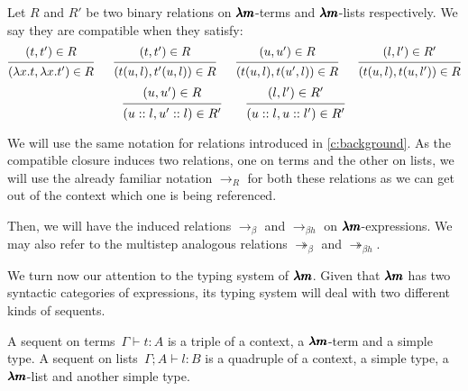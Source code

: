 \begin{definition}
  \label{compatible_relation}
  Let $R$ and $R'$ be two binary relations on $\pmb{\lambda m}$-terms and $\pmb{\lambda m}$-lists respectively.
  We say they are compatible when they satisfy:
  \[
    \begin{prooftree}
      \hypo{ (t, t') \in R }
      \infer1{ (\lambda x . t, \lambda x . t') \in R } 
    \end{prooftree}
    \quad \ \
    \begin{prooftree}
      \hypo{ (t, t') \in R }
      \infer1{ (t(u, l), t'(u, l)) \in R } 
    \end{prooftree}
    \quad \ \
    \begin{prooftree}
      \hypo{ (u, u') \in R }
      \infer1{ (t(u, l), t(u', l)) \in R } 
    \end{prooftree}
    \quad \ \
    \begin{prooftree}
      \hypo{ (l, l') \in R' }
      \infer1{ (t(u, l), t(u, l')) \in R } 
    \end{prooftree}
  \]
  \[
    \begin{prooftree}
      \hypo{ (u, u') \in R }
      \infer1{ (u::l, u'::l) \in R' } 
    \end{prooftree}
    \qquad
    \begin{prooftree}
      \hypo{ (l, l') \in R' }
      \infer1{ (u::l, u::l') \in R' } 
    \end{prooftree}
  \]
\end{definition}

\begin{notation}
  We will use the same notation for relations introduced in \cref{c:background}.
  As the compatible closure induces two relations, one on terms and the other on lists, we will use the already familiar notation $\to_R$ for both these relations as we can get out of the context which one is being referenced.
\end{notation}
Then, we will have the induced relations $\to_\beta$ and $\to_{\beta h}$ on $\pmb{\lambda m}$-expressions.
We may also refer to the multistep analogous relations $\twoheadrightarrow_\beta$ and $\twoheadrightarrow_{\beta h}$.


We turn now our attention to the typing system of $\pmb{\lambda m}$.
Given that $\pmb{\lambda m}$ has two syntactic categories of expressions, its typing system will deal with two different kinds of sequents.

\begin{definition}[Sequent]
  A sequent on terms~$\Gamma \vdash t:A$ is a triple of a context, a $\pmb{\lambda m}$-term and a simple type.
  A sequent on lists~$\Gamma;A \vdash l:B$ is a quadruple of a context, a simple type, a $\pmb{\lambda m}$-list and another simple type.
\end{definition}

